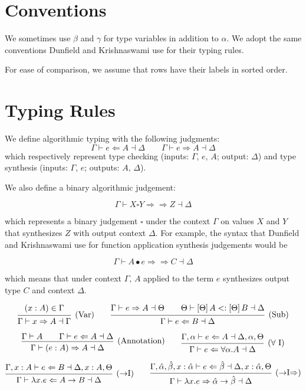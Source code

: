 \documentclass{article}
\renewcommand{\implies}{\Rightarrow}
\newcommand{\subtype}{<:}
\newcommand{\synthesizes}{\Rightarrow \!\!\! \Rightarrow}
\newcommand{\app}{\bullet}
\newcommand{\ev}{\hat}
\newcommand{\spc}{\qquad}
\newcommand{\apply}[1]{\left[#1\right]}
\newcommand{\synth}[4]{#1 \vdash #2 \Rightarrow #3 \dashv #4}
\renewcommand{\check}[4]{#1 \vdash #2 \Leftarrow #3 \dashv #4}
\newcommand{\presynth}[6]{#1 \vdash #2 #3 #4 \synthesizes #5 \dashv #6}
\newcommand{\subtypes}[4]{#1 \vdash #2 \subtype #3 \dashv #4}
\newcommand{\deduct}[3][]
{
  \begin{prooftree}
    \hypo{#2}
    \infer1[\text{#1}]{#3}
  \end{prooftree}
}
\begin{document}
\section{Conventions}

We sometimes use $\beta$ and $\gamma$ for type variables in addition
to $\alpha$. We adopt the same
conventions Dunfield and Krishnaswami use for their typing rules.

For ease of comparison, we assume that rows have their labels in sorted order.

\section{Typing Rules}
We define algorithmic typing with the following judgments:
\[
\check{\Gamma}{e}{A}{\Delta}
\spc
\synth{\Gamma}{e}{A}{\Delta}
\]
which respectively represent type checking (inputs: $\Gamma$, $e$, $A$; output: $\Delta$) and type synthesis (inputs: $\Gamma$, $e$; outputs: $A$, $\Delta$).

We also define a binary algorithmic judgement:

\[
\presynth{\Gamma}{X}{\square}{Y}{Z}{\Delta}
\]

which represents a binary judgement \(\square\) under the context \(\Gamma\) on
values \(X\) and \(Y\) that synthesizes \(Z\) with output context \(\Delta\).
For example, the syntax that Dunfield and Krishnaswami use for function
application synthesis judgements would be

\[
\presynth \Gamma A \app e C \Delta
\]

which means that under context \(\Gamma\), \(A\) applied to the term \(e\)
synthesizes output type \(C\) and context \(\Delta\).

\[
  \deduct[(Var)]
  {
    (x : A) \in \Gamma
  }
  { \synth{\Gamma}{x}{A}{\Gamma} }
  \spc
  \deduct[(Sub)]
  {
    \synth{\Gamma}{e}{A}{\Theta} \spc
    \subtypes{\Theta}{\apply\Theta A}{\apply\Theta B}{\Delta}
  }
  { \check{\Gamma}{e}{B}{\Delta} }
\]

\[
  \deduct[(Annotation)]
  { \Gamma \vdash A \spc \check{\Gamma}{e}{A}{\Delta} }
  { \synth{\Gamma}{(e : A)}{A}{\Delta} }
  \spc
  \deduct[(\(\forall\) I)]
  { \check{\Gamma, \alpha}{e}{A}{\Delta, \alpha, \Theta} }
  { \check{\Gamma}{e}{\forall \alpha. A}{\Delta} }
\]

\[
  \deduct[(\(\to\)I)]
  { \check{\Gamma, x : A}{e}{B}{\Delta, x : A, \Theta} }
  { \check{\Gamma}{\lambda x. e}{A \to B}{\Delta} }
  \spc
  \deduct[(\(\to\)I\(\implies\))]
  { \check{\Gamma, \ev\alpha, \ev\beta, x : \ev\alpha}{e}{\ev\beta}{\Delta, x : \ev\alpha, \Theta} }
  { \synth{\Gamma}{\lambda x. e}{\ev\alpha \to \ev\beta}{\Delta} }
\]
\end{document}
